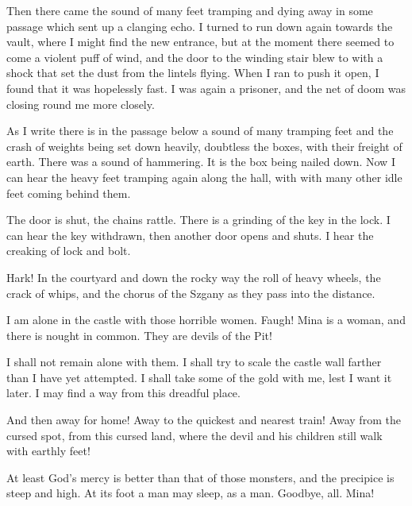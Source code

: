 Then there came the sound of many feet tramping and dying away in some passage which sent up a clanging echo. I turned to run down again towards the vault, where I might find the new entrance, but at the moment there seemed to come a violent puff of wind, and the door to the winding stair blew to with a shock that set the dust from the lintels flying. When I ran to push it open, I found that it was hopelessly fast. I was again a prisoner, and the net of doom was closing round me more closely. 

As I write there is in the passage below a sound of many tramping feet and the crash of weights being set down heavily, doubtless the boxes, with their freight of earth. There was a sound of hammering. It is the box being nailed down. Now I can hear the heavy feet tramping again along the hall, with with many other idle feet coming behind them. 

The door is shut, the chains rattle. There is a grinding of the key in the lock. I can hear the key withdrawn, then another door opens and shuts. I hear the creaking of lock and bolt. 

Hark! In the courtyard and down the rocky way the roll of heavy wheels, the crack of whips, and the chorus of the Szgany as they pass into the distance. 

I am alone in the castle with those horrible women. Faugh! Mina is a woman, and there is nought in common. They are devils of the Pit! 

I shall not remain alone with them. I shall try to scale the castle wall farther than I have yet attempted. I shall take some of the gold with me, lest I want it later. I may find a way from this dreadful place. 

And then away for home! Away to the quickest and nearest train! Away from the cursed spot, from this cursed land, where the devil and his children still walk with earthly feet! 

At least God's mercy is better than that of those monsters, and the precipice is steep and high. At its foot a man may sleep, as a man. Goodbye, all. Mina! 

